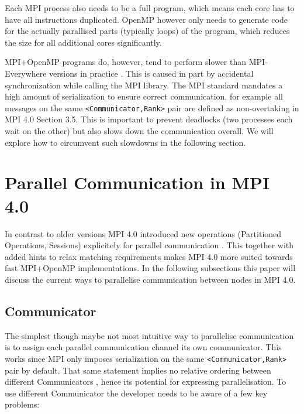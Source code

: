 \documentclass[sigconf]{acmart}
\begin{document}
Each MPI process also needs to be a full program, which means each core has to have all instructions duplicated.
OpenMP however only needs to generate code for the actually parallised parts (typically loops) of the program, which reduces the size for all additional cores significantly.

MPI+OpenMP programs do, however, tend to perform slower than MPI-Everywhere versions in practice \cite{zambreLessonsLearned2022}.
This is caused in part by accidental synchronization while calling the MPI library.
The MPI standard mandates a high amount of serialization to ensure correct communication, for example all messages on the same \verb|<Communicator,Rank>| pair are defined as non-overtaking in MPI 4.0 Section 3.5\cite{mpi40}.
This is important to prevent deadlocks (two processes each wait on the other) but also slows down the communication overall.
We will explore how to circumvent such slowdowns in the following section.


\section{Parallel Communication in MPI 4.0}


In contrast to older versions MPI 4.0 introduced new operations (Partitioned Operations, Sessions) explicitely for parallel communication \cite{mpi40}.
This together with added hints to relax matching requirements makes MPI 4.0 more suited towards fast MPI+OpenMP implementations.
In the following subsections this paper will discuss the current ways to parallelise communication between nodes in MPI 4.0.

\subsection{Communicator}

The simplest though maybe not most intuitive way to parallelise communication is to assign each parallel communication channel its own communicator.
This works since MPI only imposes serialization on the same \verb|<Communicator,Rank>| pair by default.
That same statement implies no relative ordering between different Communicators \cite{zambreLessonsLearned2022}, hence its potential for expressing parallelisation.
To use different Communicator the developer needs to be aware of a few key problems:
\end{document}
